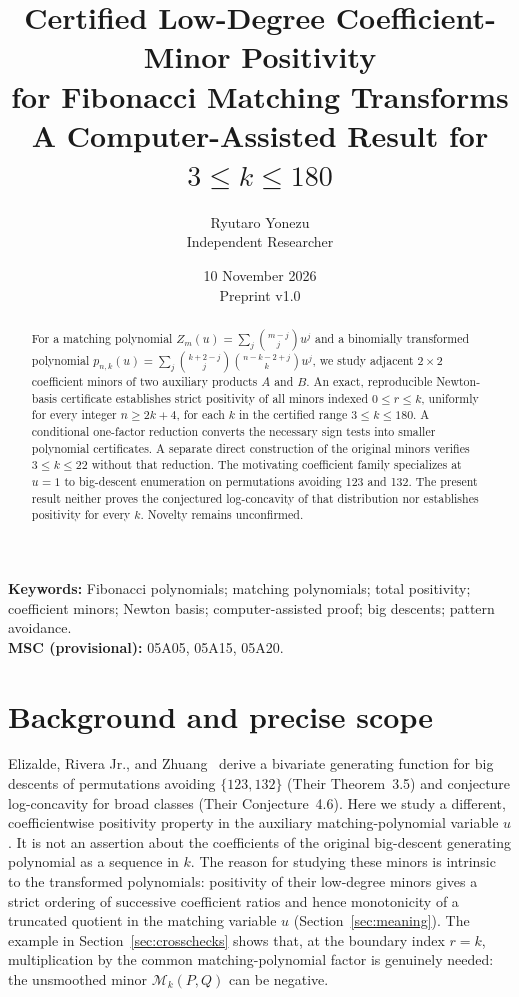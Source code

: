 \documentclass[11pt,a4paper]{article}
\title{Certified Low-Degree Coefficient-Minor Positivity\\for Fibonacci Matching Transforms\\\large A Computer-Assisted Result for $3\leq k\leq180$}
\author{Ryutaro Yonezu\\\small Independent Researcher}
\date{10 November 2026\\\small Preprint v1.0}
\newcommand{\M}{\mathcal M}
\begin{document}
\maketitle
\begin{abstract}
For a matching polynomial $Z_m(u)=\sum_j\binom{m-j}{j}u^j$ and a binomially
transformed polynomial $p_{n,k}(u)=\sum_j\binom{k+2-j}{j}\binom{n-k-2+j}{k}u^j$,
we study adjacent $2\times2$ coefficient minors of two auxiliary products
$A$ and $B$. An exact, reproducible Newton-basis certificate establishes
strict positivity of all minors indexed $0\le r\le k$, uniformly for every
integer $n\ge2k+4$, for each $k$ in the certified range $3\le k\le180$.
A conditional one-factor reduction converts the necessary sign tests into
smaller polynomial certificates. A separate direct construction of the
original minors verifies $3\le k\le22$ without that reduction.
The motivating coefficient family specializes at $u=1$ to big-descent
enumeration on permutations avoiding 123 and 132. The present result
neither proves the conjectured log-concavity of that distribution nor
establishes positivity for every $k$. Novelty remains unconfirmed.
\end{abstract}
\noindent\textbf{Keywords:} Fibonacci polynomials; matching polynomials;
total positivity; coefficient minors; Newton basis; computer-assisted proof;
big descents; pattern avoidance.\\
\textbf{MSC (provisional):} 05A05, 05A15, 05A20.

\section{Background and precise scope}
Elizalde, Rivera Jr., and Zhuang~\cite{ERZ} derive a bivariate generating
function for big descents of permutations avoiding $\{123,132\}$
(Their Theorem~3.5) and conjecture log-concavity for broad classes
(Their Conjecture~4.6). Here we study a different, coefficientwise
positivity property in the auxiliary matching-polynomial variable $u$.
It is not an assertion about the coefficients of the original big-descent
generating polynomial as a sequence in $k$.
The reason for studying these minors is intrinsic to the transformed
polynomials: positivity of their low-degree minors gives a strict ordering
of successive coefficient ratios and hence monotonicity of a truncated
quotient in the matching variable $u$ (Section~\ref{sec:meaning}).
The example in Section~\ref{sec:crosschecks} shows that, at the boundary
index $r=k$, multiplication by the common matching-polynomial factor
is genuinely needed: the unsmoothed minor $\M_k(P,Q)$ can be negative.
\end{document}
